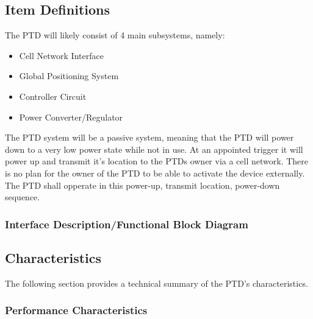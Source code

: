 \documentclass[11pt]{article}
\begin{document}
\subsection{Item Definitions}
The PTD will likely consist of 4 main subsystems, namely:
\begin{itemize}
    \item Cell Network Interface
    \item Global Positioning System
    \item Controller Circuit
    \item Power Converter/Regulator
\end{itemize}
The PTD system will be a passive system, meaning that the PTD will power down to a very low power state while not in use. At an appointed 
trigger it will power up and transmit it's location to the PTDs owner via a cell network. There is no plan for the owner of the PTD to be able to 
activate the device externally. The PTD shall opperate in this power-up, transmit location, power-down sequence.

\subsubsection{Interface Description/Functional Block Diagram}




\subsection{Characteristics}
The following section provides a technical summary of the PTD's characteristics.

\subsubsection{Performance Characteristics}
\end{document}
